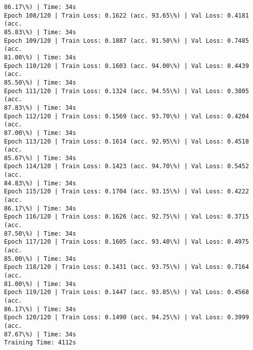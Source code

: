 \documentclass[8pt]{extarticle}
\begin{document}
\begin{Verbatim}[commandchars=\\\{\}]
86.17\%) | Time: 34s
Epoch 108/120 | Train Loss: 0.1622 (acc. 93.65\%) | Val Loss: 0.4181 (acc.
85.83\%) | Time: 34s
Epoch 109/120 | Train Loss: 0.1887 (acc. 91.50\%) | Val Loss: 0.7485 (acc.
81.00\%) | Time: 34s
Epoch 110/120 | Train Loss: 0.1603 (acc. 94.00\%) | Val Loss: 0.4439 (acc.
85.50\%) | Time: 34s
Epoch 111/120 | Train Loss: 0.1324 (acc. 94.55\%) | Val Loss: 0.3805 (acc.
87.83\%) | Time: 34s
Epoch 112/120 | Train Loss: 0.1569 (acc. 93.70\%) | Val Loss: 0.4204 (acc.
87.00\%) | Time: 34s
Epoch 113/120 | Train Loss: 0.1614 (acc. 92.95\%) | Val Loss: 0.4518 (acc.
85.67\%) | Time: 34s
Epoch 114/120 | Train Loss: 0.1423 (acc. 94.70\%) | Val Loss: 0.5452 (acc.
84.83\%) | Time: 34s
Epoch 115/120 | Train Loss: 0.1704 (acc. 93.15\%) | Val Loss: 0.4222 (acc.
86.17\%) | Time: 34s
Epoch 116/120 | Train Loss: 0.1626 (acc. 92.75\%) | Val Loss: 0.3715 (acc.
87.50\%) | Time: 34s
Epoch 117/120 | Train Loss: 0.1605 (acc. 93.40\%) | Val Loss: 0.4975 (acc.
85.00\%) | Time: 34s
Epoch 118/120 | Train Loss: 0.1431 (acc. 93.75\%) | Val Loss: 0.7164 (acc.
81.00\%) | Time: 34s
Epoch 119/120 | Train Loss: 0.1447 (acc. 93.85\%) | Val Loss: 0.4568 (acc.
86.17\%) | Time: 34s
Epoch 120/120 | Train Loss: 0.1490 (acc. 94.25\%) | Val Loss: 0.3999 (acc.
87.67\%) | Time: 34s
Training Time: 4112s


\end{Verbatim}
\end{document}
